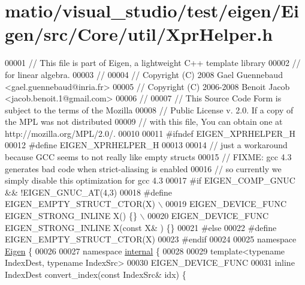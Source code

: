 \hypertarget{matio_2visual__studio_2test_2eigen_2_eigen_2src_2_core_2util_2_xpr_helper_8h_source}{}\section{matio/visual\+\_\+studio/test/eigen/\+Eigen/src/\+Core/util/\+Xpr\+Helper.h}
\label{matio_2visual__studio_2test_2eigen_2_eigen_2src_2_core_2util_2_xpr_helper_8h_source}

\begin{DoxyCode}
00001 \textcolor{comment}{// This file is part of Eigen, a lightweight C++ template library}
00002 \textcolor{comment}{// for linear algebra.}
00003 \textcolor{comment}{//}
00004 \textcolor{comment}{// Copyright (C) 2008 Gael Guennebaud <gael.guennebaud@inria.fr>}
00005 \textcolor{comment}{// Copyright (C) 2006-2008 Benoit Jacob <jacob.benoit.1@gmail.com>}
00006 \textcolor{comment}{//}
00007 \textcolor{comment}{// This Source Code Form is subject to the terms of the Mozilla}
00008 \textcolor{comment}{// Public License v. 2.0. If a copy of the MPL was not distributed}
00009 \textcolor{comment}{// with this file, You can obtain one at http://mozilla.org/MPL/2.0/.}
00010 
00011 \textcolor{preprocessor}{#ifndef EIGEN\_XPRHELPER\_H}
00012 \textcolor{preprocessor}{#define EIGEN\_XPRHELPER\_H}
00013 
00014 \textcolor{comment}{// just a workaround because GCC seems to not really like empty structs}
00015 \textcolor{comment}{// FIXME: gcc 4.3 generates bad code when strict-aliasing is enabled}
00016 \textcolor{comment}{// so currently we simply disable this optimization for gcc 4.3}
00017 \textcolor{preprocessor}{#if EIGEN\_COMP\_GNUC && !EIGEN\_GNUC\_AT(4,3)}
00018 \textcolor{preprocessor}{  #define EIGEN\_EMPTY\_STRUCT\_CTOR(X) \(\backslash\)}
00019 \textcolor{preprocessor}{    EIGEN\_DEVICE\_FUNC EIGEN\_STRONG\_INLINE X() \{\} \(\backslash\)}
00020 \textcolor{preprocessor}{    EIGEN\_DEVICE\_FUNC EIGEN\_STRONG\_INLINE X(const X& ) \{\}}
00021 \textcolor{preprocessor}{#else}
00022 \textcolor{preprocessor}{  #define EIGEN\_EMPTY\_STRUCT\_CTOR(X)}
00023 \textcolor{preprocessor}{#endif}
00024 
00025 \textcolor{keyword}{namespace }\hyperlink{namespace_eigen}{Eigen} \{
00026 
00027 \textcolor{keyword}{namespace }\hyperlink{namespaceinternal}{internal} \{
00028 
00029 \textcolor{keyword}{template}<\textcolor{keyword}{typename} IndexDest, \textcolor{keyword}{typename} IndexSrc>
00030 EIGEN\_DEVICE\_FUNC
00031 \textcolor{keyword}{inline} IndexDest convert\_index(\textcolor{keyword}{const} IndexSrc& idx) \{

\end{DoxyCode}
